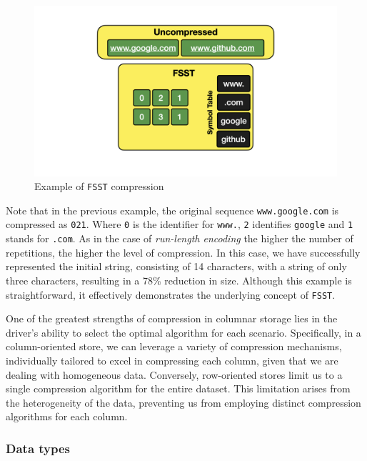 \begin{figure}[ht]
    \centering
    \includegraphics[width=.8\linewidth]{figures/diagrams/10-3_fsst.png}
    \caption[Example of \texttt{FSST} compression]{Example of \texttt{FSST} compression \cite{Raasveldt_2022}}
    \label{fig:fsst}
\end{figure}

Note that in the previous example, the original sequence \texttt{www.google.com} is compressed as \texttt{021}. Where \texttt{0} is the identifier for \texttt{www.}, \texttt{2} identifies \texttt{google} and \texttt{1} stands for \texttt{.com}. As in the case of \textit{run-length encoding} the higher the number of repetitions, the higher the level of compression. In this case, we have successfully represented the initial string, consisting of 14 characters, with a string of only three characters, resulting in a 78\% reduction in size. Although this example is straightforward, it effectively demonstrates the underlying concept of \texttt{FSST}.

One of the greatest strengths of compression in columnar storage lies in the driver's ability to select the optimal algorithm for each scenario. Specifically, in a column-oriented store, we can leverage a variety of compression mechanisms, individually tailored to excel in compressing each column, given that we are dealing with homogeneous data. Conversely, row-oriented stores limit us to a single compression algorithm for the entire dataset. This limitation arises from the heterogeneity of the data, preventing us from employing distinct compression algorithms for each column.

\subsubsection{Data types}


